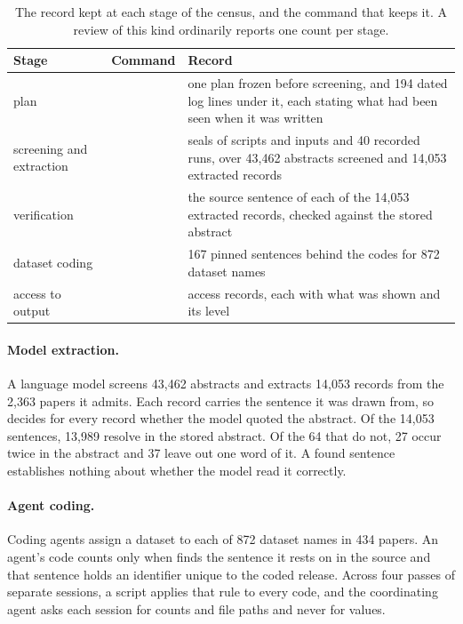 \begin{table}[H]
\centering
\small
\caption{The record kept at each stage of the census, and the command that keeps it. A review of
this kind ordinarily reports one count per stage.}
\label{tab:census}
\begin{tabular}{@{}>{\raggedright\arraybackslash}p{}>{\raggedright\arraybackslash}p{}>{\raggedright\arraybackslash}p{}@{}}
\toprule
\textbf{Stage} & \textbf{Command} & \textbf{Record} \\
\midrule
plan & \prereg{} & one plan frozen before screening, and 194 dated log lines under it, each stating what had been seen when it was written \\
screening and extraction & \results{} & 90 seals of scripts and inputs and 40 recorded runs, over 43{,}462 abstracts screened and 14{,}053 extracted records \\
verification & \citations{} & the source sentence of each of the 14{,}053 extracted records, checked against the stored abstract \\
dataset coding & \citations{} & 2{,}167 pinned sentences behind the codes for 872 dataset names \\
access to output & \results{} & 26 access records, each with what was shown and its level \\
\bottomrule
\end{tabular}
\end{table}

\paragraph{Model extraction.} A language model screens 43{,}462 abstracts and extracts 14{,}053
records from the 2{,}363 papers it admits. Each record carries the sentence it was drawn
from, so  decides for every record whether the model quoted the abstract.
Of the 14{,}053 sentences, 13{,}989 resolve in the stored abstract. Of the 64 that do not, 27
occur twice in the abstract and 37 leave out one word of it. A found sentence establishes nothing
about whether the model read it correctly.

\paragraph{Agent coding.} Coding agents assign a dataset to each of 872 dataset names in 434
papers. An agent's code counts only when  finds the sentence it rests on in the
source and that sentence holds an identifier unique to the coded release. Across four passes of
separate sessions, a script applies that rule to every code, and the coordinating agent asks each
session for counts and file paths and never for values.

